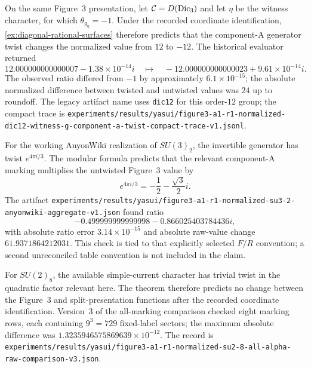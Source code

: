 \begin{example}
\label{ex:dic3-yasui-a1}
On the same Figure~3 presentation, let \(\mathcal{C}=D(\mathrm{Dic}_3)\) and let
\(\eta\) be the witness character, for which
$\theta_{g_\eta}=-1$.  Under the recorded coordinate identification,
\cref{ex:diagonal-rational-surfaces} therefore predicts that the component-A
generator twist changes the normalized value from $12$ to $-12$.  The
historical evaluator returned
\[
  12.000000000000007-1.38\times10^{-14}i
  \quad\longmapsto\quad
  -12.000000000000023+9.61\times10^{-14}i.
\]
The observed ratio differed from $-1$ by approximately $6.1\times10^{-15}$;
the absolute normalized difference between twisted and untwisted values was
$24$ up to roundoff.  The legacy artifact name uses \texttt{dic12} for this
order-$12$ group; the compact trace is
\nolinkurl{experiments/results/yasui/figure3-a1-r1-normalized-dic12-witness-g-component-a-twist-compact-trace-v1.jsonl}.
\end{example}

\begin{example}
\label{ex:su3-2-yasui-a1}
For the working AnyonWiki realization of $SU(3)_2$, the invertible generator
has twist $e^{4\pi i/3}$.  The modular formula predicts that the relevant
component-A marking multiplies the untwisted Figure~3 value by
\[
 e^{4\pi i/3}=-\frac12-\frac{\sqrt3}{2}i.
\]
The artifact
\nolinkurl{experiments/results/yasui/figure3-a1-r1-normalized-su3-2-anyonwiki-aggregate-v1.json}
found ratio
\[
 -0.499999999999998-0.866025403784436i,
\]
with absolute ratio error $3.14\times10^{-15}$ and absolute raw-value change
$61.9371864212031$.
This check is tied to that explicitly selected $F/R$ convention; a second
unreconciled table convention is not included in the claim.
\end{example}

\begin{example}
\label{ex:su2-8-yasui-a1}
For $SU(2)_8$, the available simple-current character has trivial twist in
the quadratic factor relevant here.  The theorem therefore predicts no
change between the Figure~3 and split-presentation functions after the
recorded coordinate identification.  Version~3 of the all-marking comparison
checked eight marking rows, each containing $9^3=729$ fixed-label sectors;
the maximum absolute difference was
$1.3235946575869639\times10^{-12}$.  The record is
\nolinkurl{experiments/results/yasui/figure3-a1-r1-normalized-su2-8-all-alpha-raw-comparison-v3.json}.
\end{example}

